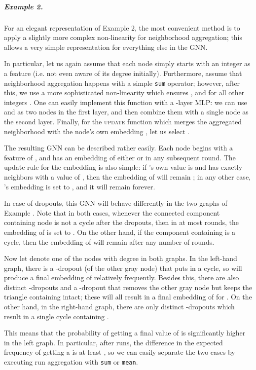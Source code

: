 \documentclass{article}
\begin{document}
\subparagraph*{Example 2.} For an elegant representation of Example 2, the most convenient method is to apply a slightly more complex non-linearity for neighborhood aggregation; this allows a very simple representation for everything else in the GNN.

In particular, let us again assume that each node simply starts with an integer  as a feature (i.e. not even aware of its degree initially). Furthermore, assume that neighborhood aggregation happens with a simple \texttt{sum} operator; however, after this, we use a more sophisticated non-linearity  which ensures , and  for all other integers . One can easily implement this function with a -layer MLP: we can use  and  as two nodes in the first layer, and then combine them with a single node  as the second layer. Finally, for the \textsc{update} function which merges the aggregated neighborhood  with the node's own embedding , let us select .

The resulting GNN can be described rather easily. Each node begins with a feature of , and has an embedding of either  or  in any subsequent round. The update rule for the embedding is also simple: if 's own value is  and  has exactly  neighbors with a value of , then the embedding of  will remain ; in any other case, 's embedding is set to , and it will remain  forever.

In case of dropouts, this GNN will behave differently in the two graphs of Example . Note that in both cases, whenever the connected component  containing node  is not a cycle after the dropouts, then in at most  rounds, the embedding of  is set to . On the other hand, if the component containing  is a cycle, then the embedding of  will remain  after any number of rounds.

Now let  denote one of the nodes with degree  in both graphs. In the left-hand graph, there is a -dropout (of the other gray node) that puts  in a cycle, so  will produce a final embedding of  relatively frequently. Besides this, there are also  distinct -dropouts and a -dropout that removes the other gray node but keeps the triangle containing  intact; these will all result in a final embedding of  for . On the other hand, in the right-hand graph, there are only  distinct -dropouts which result in a single cycle containing .

This means that the probability of getting a final value of  is significantly higher in the left graph. In particular, after  runs, the difference in the expected frequency of getting a  is at least , so we can easily separate the two cases by executing run aggregation with \texttt{sum} or \texttt{mean}.
\end{document}
